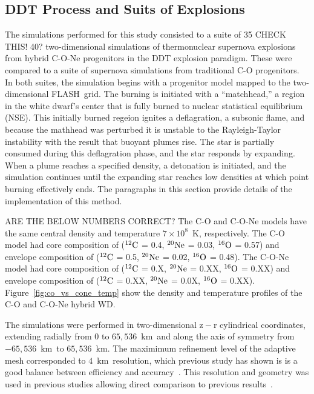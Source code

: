 \documentclass[iop,apj]{emulateapj}
\newcommand{\figref}[1]{Figure~\ref{#1}}
\newcommand{\C}[1]{\ensuremath{{}^{#1}{\rm C}}}
\newcommand{\Ox}[1]{\ensuremath{{}^{#1}{\rm O}}}
\newcommand{\Ne}[1]{\ensuremath{{}^{#1}{\rm Ne}}}
\newcommand{\code}[1]{\textsc{#1}}
\newcommand{\FLASH}{\code{FLASH}}
\newcommand{\unitstyle}[1]{\ensuremath{\mathrm{#1}}}
\newcommand{\kilo}{\unitstyle{k}}
\newcommand{\meter}{\unitstyle{m}}
\newcommand{\km}{\kilo\meter}   %
\begin{document}
\subsection{DDT Process and Suits of Explosions}

The simulations performed for this study consisted to a suite of
{\color{red} 35 CHECK THIS! 40?} two-dimensional simulations of 
thermonuclear supernova
explosions from hybrid C-O-Ne progenitors in the DDT explosion paradigm. These 
were compared to a suite of supernova simulations from traditional
C-O progenitors. In both suites, the simulation
begins with a progenitor model mapped to the two-dimensional 
\FLASH\ grid. The burning is initiated with a ``matchhead,'' a region 
in the white dwarf's center that is fully burned to nuclear statistical
equilibrium (NSE). 
This initially burned regeion ignites a deflagration, a subsonic
flame, and because the mathhead was perturbed it is unstable to
the Rayleigh-Taylor instability with the result that buoyant plumes 
rise. The star is partially consumed during this deflagration phase,
and the star responds by expanding.
When a plume reaches a specified density,
a detonation is initiated, and the simulation continues until 
the expanding star reaches low densities at which point burning
effectively ends. The paragraphs in this section provide details
of the implementation of this method.


{\color{red} ARE THE BELOW NUMBERS CORRECT?}
The C-O and C-O-Ne models have the same central density
and temperature $7 \times 10^8$~K, respectively.
The C-O model had core composition of (\C{12} = 0.4, 
\Ne{20} = 0.03, \Ox{16} = 0.57) and envelope composition 
of (\C{12} = 0.5, \Ne{20} = 0.02, \Ox{16} = 0.48). 
The C-O-Ne model had core composition of (\C{12} = 0.X, 
\Ne{20} = 0.XX, \Ox{16} = 0.XX) and envelope composition 
of (\C{12} = 0.XX, \Ne{20} = 0.0X, \Ox{16} = 0.XX). 
\figref{fig:co_vs_cone_temp} show the density and temperature 
profiles of the C-O and C-O-Ne hybrid WD.

The simulations were performed in two-dimensional $\mathrm{z-r}$
cylindrical coordinates, extending radially from 0 to
$65,536$~\km\ and along the axis of symmetry from $-65,536$~\km\ to
$65,536$~\km. The maximimum refinement level of the adaptive mesh 
corresponded to $4$~\km\ resolution, which previous study has shown is
is a good balance between efficiency and 
accuracy~\citep{townsley.calder.ea:flame,townetal2009}.
This resolution and geometry was used in previous studies
allowing direct comparison to previous results~\citep{kruegetal12}.
\end{document}
